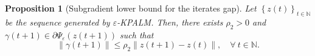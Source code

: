 \documentclass[11pt]{article}
\numberwithin{equation}{section}
\newtheorem{proposition}{Proposition}[section]
\newtheorem{lemma}{Lemma}[proposition]
\begin{document}
%

\begin{proposition}[Subgradient lower bound for the iterates gap]
Let $\left\lbrace z(t) \right\rbrace_{t \in \mathbb{N}}$ be the sequence generated by $\varepsilon$-KPALM. Then, there exists $\rho_2 > 0$ and $\gamma(t+1) \in \partial \Psi_{\varepsilon}(z(t+1))$ such that 
\begin{equation*}
	\| \gamma(t+1)\| \leq \rho_2 \|z(t+1) - z(t)\|, \quad \forall \: t \in \mathbb{N} .
\end{equation*}
\end{proposition}
\end{document}

